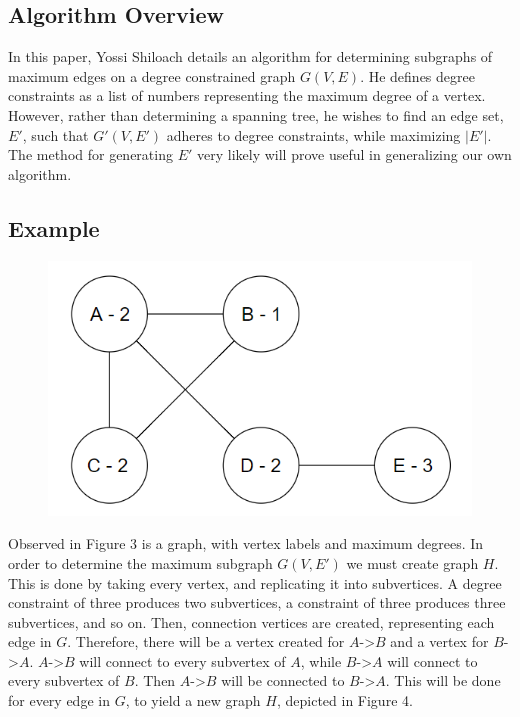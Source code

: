 \documentclass{article}
\begin{document}
	\subsection{Algorithm Overview}
	In this paper, Yossi Shiloach details an algorithm for determining subgraphs of maximum edges on a degree constrained graph $G(V,E)$. He defines
	degree constraints as a list of numbers representing the maximum degree of a vertex. However, rather than determining a spanning tree, he wishes to find an edge set, $E'$, such that $G'(V,E')$ adheres to degree constraints, while maximizing $|E'|$. The method for generating $E'$ very likely will prove useful in generalizing our own algorithm.
	\subsection{Example}
	
		\begin{figure}[H]
			\caption{}
			\includegraphics{Figure3}
		\end{figure}
	
	Observed in Figure 3 is a graph, with vertex labels and maximum degrees. In order to determine the maximum subgraph $G(V,E')$ we must create graph $H$. This is done by taking every vertex, and replicating it into subvertices. A degree constraint of three produces two subvertices, a constraint of three produces three subvertices, and so on. Then, connection vertices are created, representing each edge in $G$. Therefore, there will be a vertex created for $A$->$B$ and a vertex for $B$->$A$. $A$->$B$ will connect to every subvertex of $A$, while  $B$->$A$ will connect to every subvertex of $B$. Then $A$->$B$ will be connected to  $B$->$A$. This will be done for every edge in $G$, to yield a new graph $H$, depicted in Figure 4.
	
\end{document}
